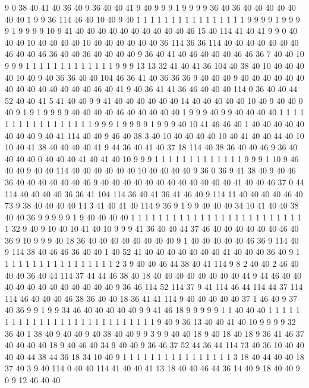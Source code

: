 9 0 38 40 41 40 36 40 9 36 40 40 41 9 40 9 9 9 1 9
9 9 9 36 40 36 40 40 40 40 40 40 40 1 9 9 36 114 46 40
10 40 9 40 1 1 1 1 1 1 1 1 1 1 1 1 1 1 1 1
9 9 9 9 1 9 9 9 9 1 9 9 9 9 10 9 41 40 40 40
40 40 40 40 40 40 40 46 15 40 114 41 40 41 9 9 0 40 40 40
10 40 40 40 40 10 40 40 40 40 40 40 36 114 36 36 114 40 40 40
40 40 40 40 46 40 40 46 36 40 40 36 40 40 40 40 9 36 40 41
40 46 40 40 40 46 46 36 7 40 40 10 9 9 9 1 1 1 1 1
1 1 1 1 1 1 1 1 9 9 9 13 13 32 41 40 41 36 104 40
38 40 10 40 40 40 40 10 40 9 40 36 36 40 40 104 46 36 41 40
36 36 36 9 40 40 40 9 40 40 40 40 40 40 40 40 40 40 40 40
40 40 46 40 41 9 40 36 41 41 36 46 40 40 40 114 0 36 40 40
44 52 40 40 41 5 41 40 40 9 9 41 40 40 40 40 40 40 14 40
40 40 40 40 10 40 9 40 40 0 40 9 1 9 1 9 9 9 9 40
40 40 40 46 40 40 40 40 40 1 9 9 9 40 9 9 40 40 40 40
1 1 1 1 1 1 1 1 1 1 1 1 1 1 1 1 1 9 9 9
1 9 9 9 9 1 9 9 9 40 10 41 46 46 40 1 40 40 40 40
40 40 40 40 9 40 41 114 40 40 9 46 40 38 3 40 10 40 40 40
40 10 40 41 40 40 44 40 10 10 40 41 38 40 40 40 40 41 9 44
36 40 41 40 37 18 114 40 38 36 40 40 46 9 36 40 40 40 40 0
40 40 40 41 40 41 40 10 9 9 9 1 1 1 1 1 1 1 1 1
1 1 1 1 9 9 9 1 10 9 46 40 40 9 40 40 114 40 40 40
40 40 40 10 40 40 40 40 9 36 0 36 9 41 38 40 9 40 46 36
40 40 40 40 40 40 46 9 40 40 40 40 40 40 40 40 40 40 40 40
41 40 40 46 37 0 44 114 40 40 40 40 36 36 41 104 114 36 40 41
36 41 46 40 9 114 11 40 40 40 40 46 40 73 9 38 40 40 40 40
14 3 41 40 41 40 114 9 36 9 1 9 9 40 40 40 34 10 41 40
40 38 40 40 36 9 9 9 9 9 1 9 40 40 40 40 1 1 1 1
1 1 1 1 1 1 1 1 1 1 1 1 1 1 1 1 1 1 1 1
1 1 32 9 40 9 10 40 10 41 40 10 9 9 9 41 36 40 40 44
37 46 40 40 40 40 40 40 46 40 36 9 10 9 9 9 40 18 36 40
40 40 40 40 40 40 40 9 1 40 40 40 40 40 46 36 9 114 40 9
114 38 40 46 46 36 40 40 1 40 52 41 40 40 40 40 40 40 40 41
40 40 40 36 40 9 1 1 1 1 1 1 1 1 1 1 1 1 1 1
1 1 1 2 3 9 40 40 46 44 38 40 41 114 9 8 2 40 40 2
46 40 40 40 36 40 44 114 37 44 44 46 38 40 18 40 40 40 40 40
40 40 40 44 9 44 46 40 40 40 40 40 40 40 40 40 40 40 40 9
36 46 114 52 114 37 9 41 114 46 44 114 44 37 114 114 46 40 40 40
46 38 36 40 40 18 36 41 41 114 9 40 40 40 40 40 37 1 46 40
9 37 40 36 9 9 1 9 9 34 46 40 40 40 40 40 9 9 41 46
18 9 9 9 9 9 1 1 40 40 40 1 1 1 1 1 1 1 1 1
1 1 1 1 1 1 1 1 1 1 1 1 1 1 1 1 1 1 9 40
9 36 13 40 40 41 40 10 9 9 9 9 32 36 40 1 38 40 9 40
40 9 40 38 40 40 9 9 3 9 9 40 40 18 9 40 18 40 18 9
36 41 46 37 40 40 40 40 18 9 40 46 40 34 9 40 40 9 36 46
37 52 44 36 44 114 73 40 36 10 40 40 40 40 44 38 44 36 18 34
10 40 9 1 1 1 1 1 1 1 1 1 1 1 1 1 1 1 1 3
18 40 44 40 40 18 37 40 3 9 40 114 0 40 40 114 41 40 40 41
13 18 40 40 46 44 36 14 40 9 18 40 40 9 0 9 12 46 40 40

